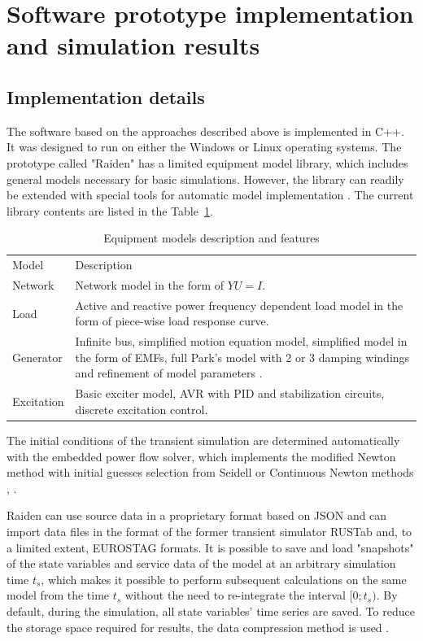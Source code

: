\documentclass[lettersize,journal]{IEEEtran}
\begin{document}
\section {Software prototype implementation and simulation results}
\subsection {Implementation details}

The software based on the approaches described above is implemented in C++. It was designed to run on either the Windows or Linux operating systems. The prototype called "Raiden" has a limited equipment model library, which includes general models necessary for basic simulations. However, the library can readily be extended with special tools for automatic model implementation \cite{mycompiler}. The current library contents are listed in the Table~\ref{tab:models}.

\begin{table}[!h]
	\caption{Equipment models description and features \label{tab:models}}
	\centering
	\setlength\extrarowheight{1pt}
	\begin{tabularx}{\columnwidth}{|l|X|}
		\hline
		Model & Description \\
		\hlineB{3}	
		Network & Network model in the form of \(YU=I\).  \\
		\hline
		Load & Active and reactive power frequency dependent load model in the form of piece-wise load response curve.\\
		\hline
		Generator & Infinite bus, simplified motion equation model, simplified model in the form of EMFs, full Park's model with 2 or 3 damping windings and refinement of model parameters \cite{Canay93}. \\
		\hline
		Excitation & Basic exciter model, AVR with PID and stabilization circuits, discrete excitation control.\\
		\hline
	\end{tabularx}
\end{table}

The initial conditions of the transient simulation are determined automatically with the embedded power flow solver, which implements the modified Newton method with initial guesses selection from Seidell or Continuous Newton methods \cite{MilanoRK09}, \cite{TostadoVliz2021}.

Raiden can use source data in a proprietary format based on JSON and can import data files in the format of the former transient simulator RUSTab and, to a limited extent, EUROSTAG formats. It is possible to save and load "snapshots" of the state variables and service data of the model at an arbitrary simulation time \(t_s\), which makes it possible to perform subsequent calculations on the same model from the time \(t_s\) without the need to re-integrate the interval \([0;t_s)\). By default, during the simulation, all state variables' time series are saved. To reduce the storage space required for results, the data compression method is used \cite{mycompression}.
\end{document}
